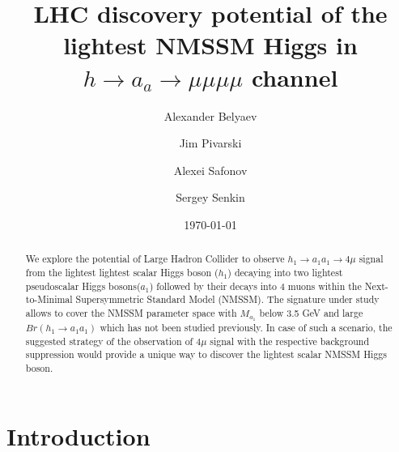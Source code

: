 \documentclass[aps,12pt,superscriptaddress,nofootinbib,floatfix,showpacs]{revtex4}
\begin{document}
\title
{LHC discovery potential 
of the lightest NMSSM Higgs in $h \to a_a \to \mu \mu \mu \mu$
channel}

\author{Alexander Belyaev}
\author{Jim Pivarski}
\author{Alexei Safonov}
\author{Sergey Senkin}


\date{\today}


\begin{abstract}
We explore the potential of Large Hadron Collider to observe  $h_1\to
a_1a_1\to 4\mu$ signal from the lightest lightest scalar Higgs boson
($h_1$) decaying into two  lightest pseudoscalar Higgs bosons($a_1$) 
followed by their decays into 4 muons within the Next-to-Minimal
Supersymmetric Standard Model (NMSSM).
The signature under study allows to cover the  NMSSM parameter space
with  $M_{a_1}$ below 3.5 GeV and large $Br(h_1\to a_1 a_1)$ 
which has not been studied previously. In case of  such a scenario,
the suggested strategy of the observation of 
$4\mu$ signal with the respective background suppression
would provide a unique way to discover
the lightest scalar NMSSM Higgs boson.
\end{abstract}


\maketitle
\newpage
\tableofcontents
\newpage

%
\section{Introduction}
\end{document}
